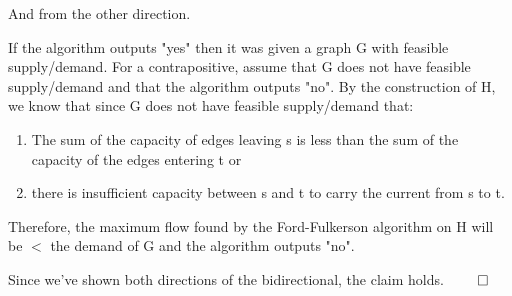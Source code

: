 \documentclass[11pt]{article}
\begin{document}
And from the other direction. 

If the algorithm outputs "yes" then it was given a graph G with feasible supply/demand. 
For a contrapositive, assume that G does not have feasible supply/demand and that the algorithm outputs "no". 
By the construction of H, we know that since G does not have feasible supply/demand that:
\begin{enumerate}
\item The sum of the capacity of edges leaving s is less than the sum of the capacity of the edges entering t or 
\item there is insufficient capacity between s and t to carry the current from s to t. 
\end{enumerate}
Therefore, the maximum flow found by the Ford-Fulkerson algorithm on H will be $<$ the demand of G and the algorithm outputs "no". 

Since we've shown both directions of the bidirectional, the claim holds. $\qed$
\end{document}
